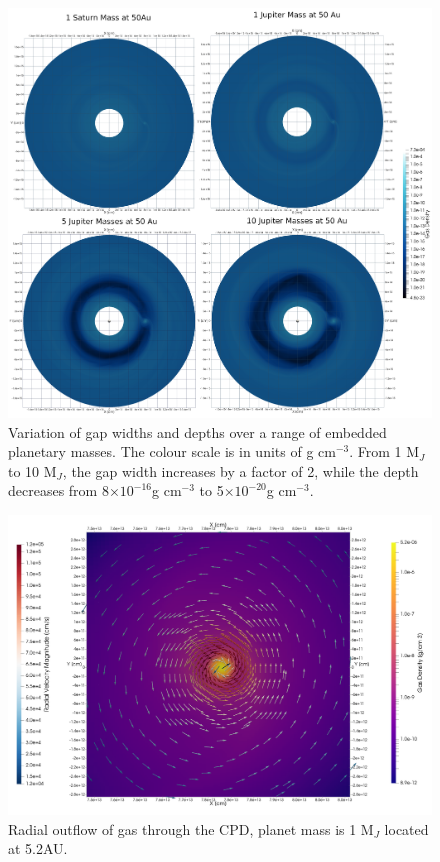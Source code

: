 \documentclass[preprint2]{aastex62}
\begin{document}
\begin{figure}[htb!]
	\centering
	\includegraphics[width=\linewidth]{figures/Presentation/Gaps/Gaps.png}
	\caption{\label{fig:gaps}Variation of gap widths and depths over a range of embedded planetary masses. The colour scale is in units of g cm$^{-3}$. From 1 M$_{J}$ to 10 M$_{J}$, the gap width increases by a factor of 2, while the depth decreases from 8$\times10^{-16}$g cm$^{-3}$ to 5$\times10^{-20}$g cm$^{-3}$.}
\end{figure}

\begin{figure}[htb!]
	\centering
	\includegraphics[width=0.95\linewidth]{figures/Presentation/OutFlowMidPlane.png}
	\caption{\label{fig:ofmid} Radial outflow of gas through the CPD, planet mass is 1 M${_J}$ located at 5.2AU.}
\end{figure}
\end{document}
